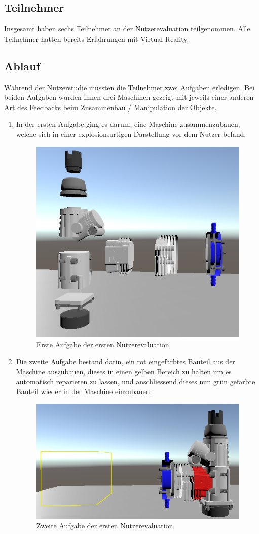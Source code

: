 \subsection{Teilnehmer}
Insgesamt haben sechs Teilnehmer an der Nutzerevaluation teilgenommen. Alle Teilnehmer hatten bereits Erfahrungen mit Virtual Reality. 

\subsection{Ablauf}
Während der Nutzerstudie mussten die Teilnehmer zwei Aufgaben erledigen. Bei beiden Aufgaben wurden ihnen drei Maschinen gezeigt mit jeweils einer anderen Art des Feedbacks beim Zusammenbau / Manipulation der Objekte.
\begin{enumerate}
	\item In der ersten Aufgabe ging es darum, eine Maschine zusammenzubauen, welche sich in einer explosionsartigen Darstellung vor dem Nutzer befand. 
	
	\begin{figure}[h!]
		\centering
		\includegraphics[keepaspectratio,width=0.28\linewidth]{img/Evaluation_Task1.PNG}
		\caption{Erste Aufgabe der ersten Nutzerevaluation}
		\label{fig:evaluation1_task1}
	\end{figure}
	
	\item Die zweite Aufgabe bestand darin, ein rot eingefärbtes Bauteil aus der Maschine auszubauen, dieses in einen gelben Bereich zu halten um es automatisch reparieren zu lassen, und anschliessend dieses nun grün gefärbte Bauteil wieder in der Maschine einzubauen.
	
	\begin{figure}[h!]
		\centering
		\includegraphics[keepaspectratio,width=0.34\linewidth]{img/Evaluation_Task2.PNG}
		\caption{Zweite Aufgabe der ersten Nutzerevaluation}
		\label{fig:evaluation1_task2}
	\end{figure}
	
\end{enumerate}

